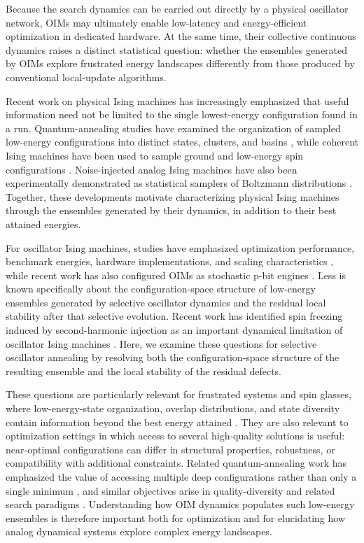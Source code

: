 \documentclass[
reprint,
amsmath,amssymb,
aps,
pre,
floatfix,
]{revtex4-2}
\begin{document}
Because the search dynamics can be carried out directly by a physical
oscillator network, OIMs may ultimately enable low-latency and energy-efficient
optimization in dedicated hardware. At the same time, their collective
continuous dynamics raises a distinct statistical question: whether the
ensembles generated by OIMs explore frustrated energy landscapes differently
from those produced by conventional local-update algorithms.

Recent work on physical Ising machines has increasingly emphasized that
useful information need not be limited to the single lowest-energy
configuration found in a run. Quantum-annealing studies have examined the
organization of sampled low-energy configurations into distinct states,
clusters, and basins \cite{Zhang2024Cyclic,Zhang2025Complexity}, while
coherent Ising machines have been used to sample ground and low-energy spin
configurations \cite{Ng2022CIMSampling}. Noise-injected analog Ising
machines have also been experimentally demonstrated as statistical samplers
of Boltzmann distributions \cite{Bohm2022StatisticalSampling}. Together,
these developments motivate characterizing physical Ising machines through
the ensembles generated by their dynamics, in addition to their best
attained energies.

For oscillator Ising machines, studies have emphasized optimization
performance, benchmark energies, hardware implementations, and scaling
characteristics \cite{OIM,machines,Energy3,Energy4}, while recent work has
also configured OIMs as stochastic p-bit engines
\cite{Ekanayake2026PBitOIM}. Less is known specifically about the
configuration-space structure of low-energy ensembles generated by selective
oscillator dynamics and the residual local stability after that selective
evolution. Recent work has identified spin freezing
induced by second-harmonic injection as an important dynamical limitation
of oscillator Ising machines \cite{Farasat2026}. Here, we examine these
questions for selective oscillator annealing by resolving both the
configuration-space structure of the resulting ensemble and the local
stability of the residual defects.

These questions are particularly relevant for frustrated systems and spin
glasses, where low-energy-state organization, overlap distributions, and
state diversity contain information beyond the best energy attained
\cite{MPV1987,Rammal1986,Wales2003}. They are also relevant to optimization
settings in which access to several high-quality solutions is useful:
near-optimal configurations can differ in structural properties,
robustness, or compatibility with additional constraints. Related
quantum-annealing work has emphasized the value of accessing multiple deep
configurations rather than only a single minimum \cite{ZhangKamenev2025NN}, and
similar objectives arise in quality-diversity and related search paradigms
\cite{QD,ExtractQD,PortfolioQD}. Understanding how OIM dynamics populates such low-energy ensembles is therefore important both for optimization and for elucidating how analog dynamical systems explore complex energy landscapes.
\end{document}
